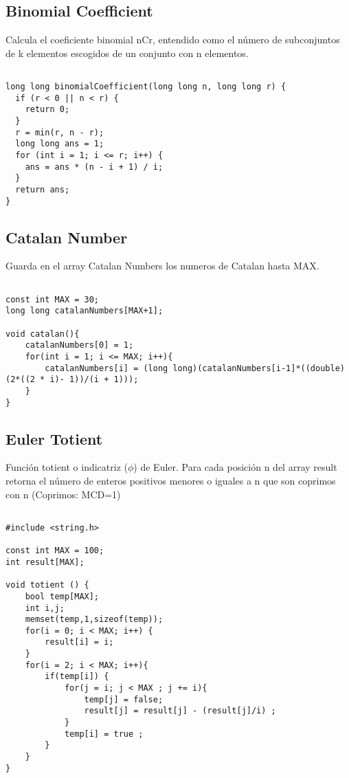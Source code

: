 \documentclass[11pt,letterpaper,twocolumn,twosided]{article}
\begin{document}
\subsection{Binomial Coefficient}
Calcula el coeficiente binomial nCr, entendido como el n\'umero de subconjuntos de k elementos escogidos de un conjunto con n elementos.
\begin{lstlisting}

long long binomialCoefficient(long long n, long long r) {
  if (r < 0 || n < r) { 
  	return 0; 
  }
  r = min(r, n - r);
  long long ans = 1;
  for (int i = 1; i <= r; i++) {
    ans = ans * (n - i + 1) / i;
  }
  return ans;
}
\end{lstlisting}

\subsection{Catalan Number}
Guarda en el array Catalan Numbers los numeros de Catalan hasta MAX.
\begin{lstlisting}

const int MAX = 30;
long long catalanNumbers[MAX+1];

void catalan(){
	catalanNumbers[0] = 1;
	for(int i = 1; i <= MAX; i++){
		catalanNumbers[i] = (long long)(catalanNumbers[i-1]*((double)(2*((2 * i)- 1))/(i + 1)));
	}
}
\end{lstlisting}

\subsection{Euler Totient}
Funci\'on totient o indicatriz ($\phi$) de Euler. Para cada posici\'on n del array result retorna el n\'umero de enteros positivos menores o iguales a n que son coprimos con n (Coprimos: MCD=1)
\begin{lstlisting}

#include <string.h>

const int MAX = 100;
int result[MAX]; 

void totient () {
	bool temp[MAX];
	int i,j;
	memset(temp,1,sizeof(temp));
	for(i = 0; i < MAX; i++) {
		result[i] = i;
	}
	for(i = 2; i < MAX; i++){
		if(temp[i]) {
			for(j = i; j < MAX ; j += i){
				temp[j] = false;
				result[j] = result[j] - (result[j]/i) ;
			}
			temp[i] = true ;
		}
	}
}
\end{lstlisting}
\end{document}
